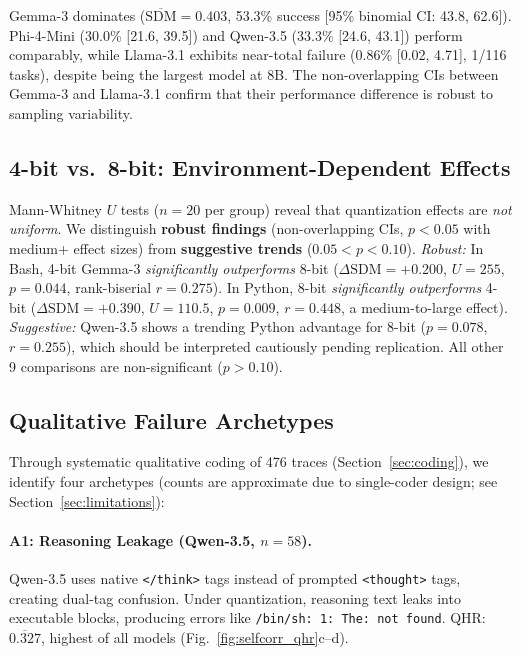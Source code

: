 \documentclass{article}
\begin{document}
Gemma-3 dominates ($\overline{\text{SDM}}=0.403$, 53.3\% success [95\% binomial CI: 43.8, 62.6]). Phi-4-Mini (30.0\% [21.6, 39.5]) and Qwen-3.5 (33.3\% [24.6, 43.1]) perform comparably, while Llama-3.1 exhibits near-total failure (0.86\% [0.02, 4.71], 1/116 tasks), despite being the largest model at 8B. The non-overlapping CIs between Gemma-3 and Llama-3.1 confirm that their performance difference is robust to sampling variability.

\subsection{4-bit vs.\ 8-bit: Environment-Dependent Effects}

Mann-Whitney $U$ tests ($n=20$ per group) reveal that quantization effects are \emph{not uniform}. We distinguish \textbf{robust findings} (non-overlapping CIs, $p<0.05$ with medium+ effect sizes) from \textbf{suggestive trends} ($0.05 < p < 0.10$). \emph{Robust:} In Bash, 4-bit Gemma-3 \emph{significantly outperforms} 8-bit ($\Delta\text{SDM}=+0.200$, $U=255$, $p=0.044$, rank-biserial $r=0.275$). In Python, 8-bit \emph{significantly outperforms} 4-bit ($\Delta\text{SDM}=+0.390$, $U=110.5$, $p=0.009$, $r=0.448$, a medium-to-large effect). \emph{Suggestive:} Qwen-3.5 shows a trending Python advantage for 8-bit ($p=0.078$, $r=0.255$), which should be interpreted cautiously pending replication. All other 9 comparisons are non-significant ($p>0.10$).

\subsection{Qualitative Failure Archetypes}
\label{sec:qualitative}

Through systematic qualitative coding of 476 traces (Section~\ref{sec:coding}), we identify four archetypes (counts are approximate due to single-coder design; see Section~\ref{sec:limitations}):

\paragraph{A1: Reasoning Leakage (Qwen-3.5, $n{=}58$).}
Qwen-3.5 uses native \texttt{</think>} tags instead of prompted \texttt{<thought>} tags, creating dual-tag confusion. Under quantization, reasoning text leaks into executable blocks, producing errors like \texttt{/bin/sh: 1: The: not found}. QHR: $\overline{0.327}$, highest of all models (Fig.~\ref{fig:selfcorr_qhr}c--d).
\end{document}
